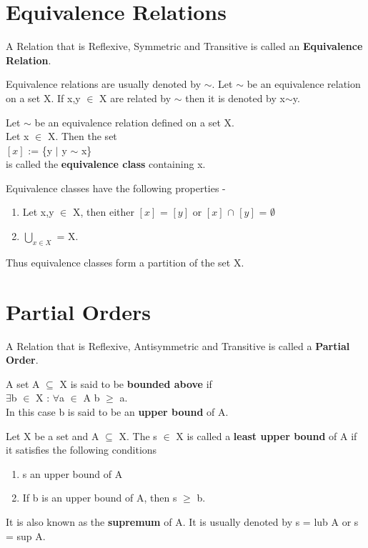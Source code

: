 \documentclass{report}
\begin{document}
\section{Equivalence Relations}
\begin{definition}
A Relation that is Reflexive, Symmetric and Transitive is called an  \textbf{Equivalence Relation}.
\end{definition}
Equivalence relations are usually denoted by $\sim$.
Let $\sim$ be an equivalence relation on a set X. If x,y $\in$ X are related by  $\sim$ then it is denoted by x$\sim$y.
\begin{definition}
Let $\sim$ be an equivalence relation defined on a set X. \\Let x $\in$ X. Then the set \\
$\left[x\right]$ := \{y $\vert$ y $\sim$ x\} \\ is called the \textbf{equivalence class} containing x.
\end{definition}

Equivalence classes have the following properties - 
\begin{enumerate}
\item Let x,y $\in$ X, then either $\left[x\right]$ = $\left[y\right]$ or $\left[x\right]$ $\cap$ $\left[y\right]$ = $\emptyset$
\item $\bigcup_{x \in X}$ = X.
\end{enumerate}
Thus equivalence classes form a partition of the set X.

\section{Partial Orders}
\begin{definition}
A Relation that is Reflexive, Antisymmetric and Transitive is called a  \textbf{Partial Order}.
\end{definition}

\begin{definition}
A set A $\subseteq$ X is said to be \textbf{bounded above} if \\$\exists$b $\in$ X : $\forall$a $\in$ A  b $\geq$ a.\\
In this case b is said to be an \textbf{upper bound} of A.
\end{definition}

\begin{definition}
Let X be a set and A $\subseteq$ X. The s $\in$ X is called a \textbf{least upper bound} of A if it satisfies the following conditions
\begin{enumerate}
\item s an upper bound of A
\item If b is an upper bound of A, then s $\geq$ b.
\end{enumerate}
It is also known as the \textbf{supremum} of A. It is usually denoted by s = lub A or s = sup A.
\end{definition}
\end{document}
